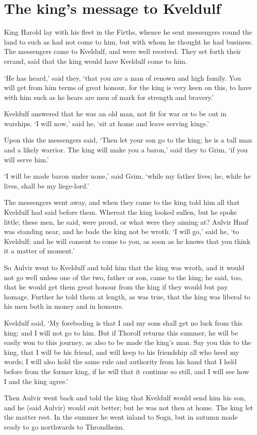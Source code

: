 \chapter{The king's message to Kveldulf}
King Harold lay with his fleet in the Firths, whence he sent messengers round the land to such as had not come to him, but with whom he thought he had business. The messengers came to Kveldulf, and were well received. They set forth their errand, said that the king would have Kveldulf come to him.

`He has heard,' said they, `that you are a man of renown and high family. You will get from him terms of great honour, for the king is very keen on this, to have with him such as he hears are men of mark for strength and bravery.'

Kveldulf answered that he was an old man, not fit for war or to be out in warships. `I will now,' said he, `sit at home and leave serving kings.'

Upon this the messengers said, `Then let your son go to the king; he is a tall man and a likely warrior. The king will make you a baron,' said they to Grim, `if you will serve him.'

`I will be made baron under none,' said Grim, `while my father lives; he, while he lives, shall be my liege-lord.'

The messengers went away, and when they came to the king told him all that Kveldulf had said before them. Whereat the king looked sullen, but he spoke little; these men, he said, were proud, or what were they aiming at? Aulvir Hnuf was standing near, and he bade the king not be wroth. `I will go,' said he, `to Kveldulf; and he will consent to come to you, as soon as he knows that you think it a matter of moment.'

So Aulvir went to Kveldulf and told him that the king was wroth, and it would not go well unless one of the two, father or son, came to the king; he said, too, that he would get them great honour from the king if they would but pay homage. Further he told them at length, as was true, that the king was liberal to his men both in money and in honours.

Kveldulf said, `My foreboding is that I and my sons shall get no luck from this king: and I will not go to him. But if Thorolf returns this summer, he will be easily won to this journey, as also to be made the king's man. Say you this to the king, that I will be his friend, and will keep to his friendship all who heed my words; I will also hold the same rule and authority from his hand that I held before from the former king, if he will that it continue so still, and I will see how I and the king agree.'

Then Aulvir went back and told the king that Kveldulf would send him his son, and he (said Aulvir) would suit better; but he was not then at home. The king let the matter rest. In the summer he went inland to Sogn, but in autumn made ready to go northwards to Throndheim.
